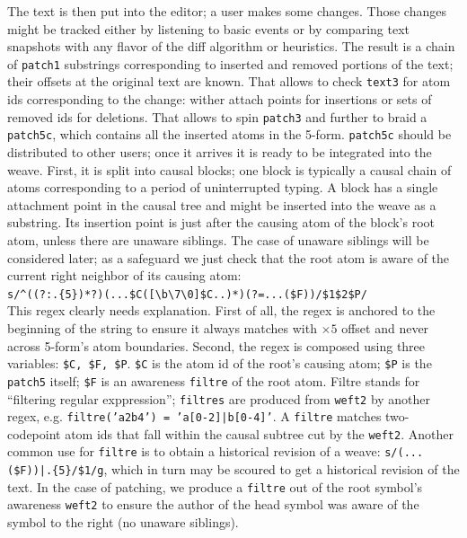 \documentclass{acm_proc_article-sp}
\begin{document}
The text is then put into the editor; a user makes some
changes. Those changes might be tracked either by listening to 
basic events or by comparing text snapshots with 
any flavor of the diff algorithm or heuristics.
The result is a chain of {\tt patch1} substrings
corresponding to inserted and removed portions of the text;
their offsets at the original text are known. That allows
to check {\tt text3} for atom ids corresponding to the
change: wither attach points for insertions or sets of
removed ids for deletions. That allows to spin {\tt patch3}
and further 
 to braid a {\tt patch5c}, which contains all
the inserted atoms in the 5-form. 
{\tt patch5c} should be distributed to other users;
once it arrives it is ready to be integrated into the weave.
First, it is split into causal blocks; one block is typically
a causal chain of atoms corresponding
to a period of uninterrupted typing.
A block has a single attachment point
in the causal tree and might be inserted into the weave as
a substring.
Its insertion point is just after the causing
atom of the block's root atom, unless there are unaware
siblings. The case of unaware siblings will be considered later;
as a safeguard we just check that the root atom
is aware of the current right neighbor of its causing atom: \\
{\small \verb`s/^((?:.{5})*?)(...$C([\b\7\0]$C..)*)(?=...($F))/$1$2$P/`}\\
This regex clearly needs explanation. First of all, the regex
is anchored to the beginning of the string to ensure it
always matches with $\times 5$ offset and never across 5-form's atom
boundaries. Second, the regex is
composed using three variables: \verb+$C, $F, $P+. \verb+$C+
is the atom id of the root's causing atom; \verb+$P+ is the
{\tt patch5} itself; \verb+$F+ is an awareness {\tt filtre}
of the root atom. Filtre stands for ``filtering regular
exppression''; {\tt filtres} are produced from {\tt weft2} by
another regex, e.g. {\tt filtre('a2b4') = 'a[0-2]|b[0-4]'}.
A {\tt filtre} matches two-codepoint atom ids that fall within
the causal subtree cut by the {\tt weft2}. Another common
use for {\tt filtre} is to obtain a historical revision of a
weave: 
{\small \verb`s/(...($F))|.{5}/$1/g`}, which in turn
may be scoured to get a historical revision of the text.
In the case of patching, we produce a {\tt filtre} out of
the root symbol's awareness {\tt weft2} to ensure the author
of the head symbol was aware of the symbol to the right 
(no unaware siblings).
\end{document}
